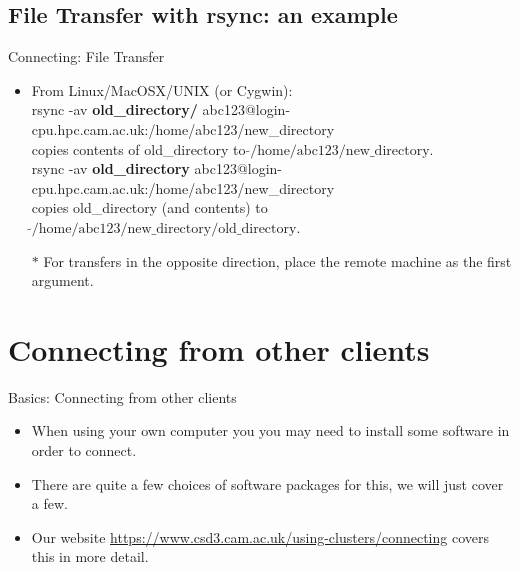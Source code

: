\subsection{File Transfer with rsync: an example}
\begin{frame}{Connecting: File Transfer}
\begin{itemize}
\item From Linux/MacOSX/UNIX (or Cygwin):\hfill\\
\alert{\footnotesize rsync -av \textbf{old\_directory/} abc123@login-cpu.hpc.cam.ac.uk:/home/abc123/new\_directory}\hfill\\
copies contents of old\_directory to $\tilde{}\text{/home/abc123/new\_directory}$.\hfill\\\smallskip
\pause
\alert{\footnotesize rsync -av \textbf{old\_directory} abc123@login-cpu.hpc.cam.ac.uk:/home/abc123/new\_directory}\hfill\\
copies old\_directory (and contents) to $\tilde{}\text{/home/abc123/new\_directory/old\_directory}$.\hfill\\
\pause
\item[$\ast$]For transfers in the opposite direction, place the remote machine as the first argument.
\end{itemize}
\end{frame}
%
\section{Connecting from other clients}
\begin{frame}{Basics: Connecting from other clients}
\begin{itemize}
\item{When using your own computer you you may need to install some software in order to connect.}
\pause
\item{There are quite a few choices of software packages for this, we will just cover a few.}
\pause
\item{Our website \url{https://www.csd3.cam.ac.uk/using-clusters/connecting} covers this in more detail.}
\end{itemize}
\end{frame}

